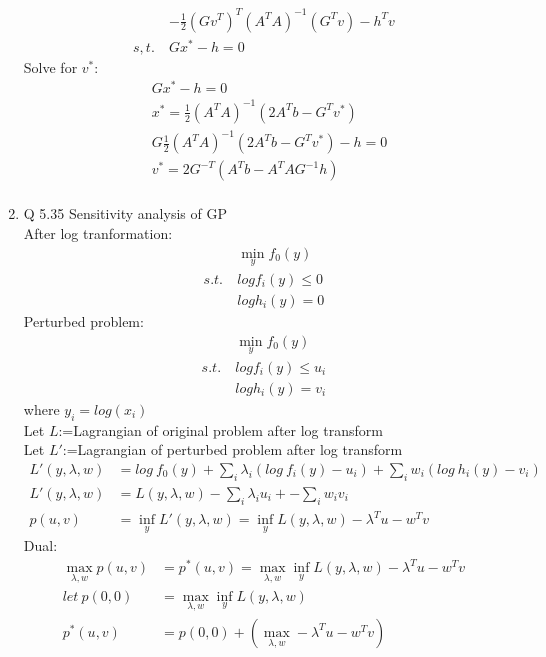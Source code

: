 \documentclass[12pt,letter]{article}
\begin{document}
\begin{enumerate}
\begin{align*}
    &-\frac{1}{2}(Gv^T)^T(A^TA)^{-1}(G^Tv) -h^Tv\\
    s,t.\ & Gx^*-h=0
  \end{align*}
  Solve for $v^*$:\\
  \begin{align*}
    &Gx^*-h=0\\
    &x^* = \frac{1}{2}(A^TA)^{-1}(2A^Tb - G^Tv^*)\\
    &G\frac{1}{2}(A^TA)^{-1}(2A^Tb - G^Tv^*)-h=0\\
    &v^*=2G^{-T}(A^Tb-A^TAG^{-1}h)\\
  \end{align*}
  \pagebreak
\item Q 5.35 Sensitivity analysis of GP\\
  After log tranformation:
  \begin{align*}
    &\min_y f_0(y)\\
    s.t.\ & log f_i(y) \leq 0\\
    & log h_i(y) = 0
  \end{align*}
  Perturbed problem:
  \begin{align*}
    &\min_y f_0(y)\\
    s.t.\ & log f_i(y) \leq u_i\\
    & log h_i(y) = v_i
  \end{align*}
  where $y_i = log(x_i)$\\
  
  Let $L$:=Lagrangian of original problem after log transform\\
  Let $L'$:=Lagrangian of perturbed problem after log transform\\
  \begin{align*}
    L'(y,\lambda,w) &= log\ f_0(y) + \sum_i \lambda_i(log\ f_i(y)-u_i) + \sum_i w_i(log\ h_i(y) -v_i)\\
    L'(y,\lambda,w) &= L(y,\lambda,w) -\sum_i \lambda_i u_i + -\sum_i w_i v_i\\
    p(u,v) &= \inf_y L'(y,\lambda,w) = \inf_y L(y,\lambda,w) - \lambda^Tu- w^Tv
  \end{align*}
  Dual:
  \begin{align*}
  \max_{\lambda,w} p(u,v) &= p^*(u,v) = \max_{\lambda,w} \inf_y L(y,\lambda,w) - \lambda^Tu- w^Tv\\
    let\ p(0,0) &= \max_{\lambda,w} \inf_y L(y,\lambda,w)\\
    p^*(u,v) &= p(0,0) + (\max_{\lambda,w} -\lambda^Tu- w^Tv)
  \end{align*}
  \\
  

\end{enumerate}
\end{document}

